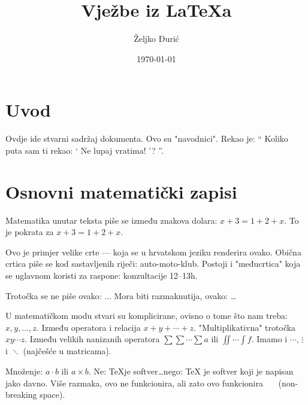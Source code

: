 \documentclass[12pt]{scrartcl}
\begin{document}
    \title{Vježbe iz \LaTeX a}
    \author{Željko Đurić}
    \date{\today}
    \maketitle
    \section{Uvod}
        Ovdje ide stvarni sadržaj dokumenta.
        Ovo su "navodnici".
        Rekao je:
        \enquote {
            Koliko puta sam ti rekao:
                \enquote {
                    Ne lupaj vratima!
                }?
        }.
    \section{Osnovni matematički zapisi}
        Matematika unutar teksta piše se između znakova dolara: $x + 3 = 1 + 2 + x$.
        To je pokrata za \(x + 3 = 1 + 2 + x\). %

        Ovo je primjer velike crte --- koja se u hrvatskom jeziku renderira ovako.
        Obična crtica piše se kod sastavljenih riječi: auto-moto-klub.
        Postoji i "međucrtica" koja se uglavnom koristi za raspone: konzultacije 12--13h.

        Trotočka se ne piše ovako: ... Mora biti razmaknutija, ovako: \ldots

        U matematičkom modu stvari su komplicirane, ovisno o tome što nam treba: $x,y,\dotsc,z$.
        Između operatora i relacija $x+y+\dotsb+z$.
        "Multiplikativna" trotočka $xy\dotsm z$.
        Između velikih nanizanih operatora $\sum\sum\dotsi\sum a$ ili $\iint\dotsi\int f$.
        Imamo i $\cdots$, $\vdots$ i $\ddots$ (najčešće u matricama).

        Množenje: $a\cdot b$ ili $a \times b$.
        Ne: \TeX je softver\ldots nego: \TeX{} je softver koji je napisan jako davno.
        Više razmaka,    ovo ne funkcionira, ali zato ovo funkcionira \ \ \ (non-breaking space).
\end{document}
